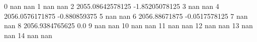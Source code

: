 0 nan nan
1 nan nan
2 2055.08642578125 -1.85205078125
3 nan nan
4 2056.0576171875 -0.880859375
5 nan nan
6 2056.88671875 -0.0517578125
7 nan nan
8 2056.9384765625 0.0
9 nan nan
10 nan nan
11 nan nan
12 nan nan
13 nan nan
14 nan nan
